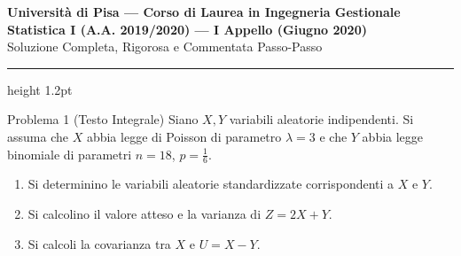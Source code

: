 \documentclass[11pt,a4paper]{article}
\begin{document}
\begin{center}
    {\LARGE\bfseries\color{navyblue} Università di Pisa --- Corso di Laurea in Ingegneria Gestionale}\\[0.4em]
    {\Large\bfseries Statistica I (A.A. 2019/2020) --- I Appello (Giugno 2020)}\\[0.3em]
    {\large\textsf{Soluzione Completa, Rigorosa e Commentata Passo-Passo}}
\end{center}
\vspace{0.5em}
\hrule height 1.2pt
\vspace{1.5em}

\begin{problemabox}{Problema 1 (Testo Integrale)}
Siano $X,Y$ variabili aleatorie indipendenti. Si assuma che $X$ abbia legge di Poisson di parametro $\lambda=3$ e che $Y$ abbia legge binomiale di parametri $n=18$, $p=\frac{1}{6}$.
\begin{enumerate}[label=(\roman*)]
    \item Si determinino le variabili aleatorie standardizzate corrispondenti a $X$ e $Y$.
    \item Si calcolino il valore atteso e la varianza di $Z=2X+ Y$.
    \item Si calcoli la covarianza tra $X$ e $U=X-Y$.
\end{enumerate}
\end{problemabox}
\end{document}
